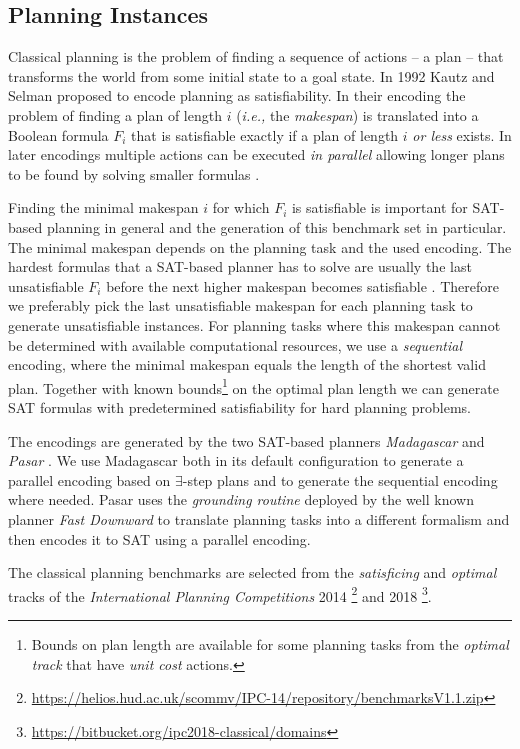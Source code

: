 \documentclass{elsarticle}
\begin{document}
\subsection{Planning Instances}
Classical planning is the problem of finding a sequence of actions -- a plan --
that transforms the world from some initial state to a goal state. In 1992 Kautz
and Selman
\cite{Kautz1992} proposed to encode planning as satisfiability. In their
encoding the problem of finding a plan of length $i$ (\textit{i.e.,} the
\emph{makespan}) is translated into a Boolean formula $F_i$ that is satisfiable
exactly if a plan of length $i$ \emph{or less} exists. In later encodings
multiple actions can be executed \emph{in parallel} allowing longer plans to be
found by solving smaller formulas \cite{Rintanen2006, Rintanen2007, Balyo2013}.

Finding the minimal makespan $i$ for which $F_i$ is satisfiable is important for
SAT-based planning in general and the generation of this benchmark set in
particular. The minimal makespan depends on the planning task and the used
encoding. The hardest formulas that a SAT-based planner has to solve are usually
the last unsatisfiable $F_i$ before the next higher makespan becomes satisfiable
\cite{Rintanen2006}. Therefore we preferably pick the last unsatisfiable
makespan for each planning task to generate unsatisfiable instances. For
planning tasks where this makespan cannot be determined with available
computational resources, we use a \emph{sequential} encoding, where the minimal
makespan equals the length of the shortest valid plan. Together with known
bounds\footnote{Bounds on plan length are available for some planning tasks from
  the \emph{optimal track} that have \emph{unit cost} actions.} on the optimal
plan length we can generate SAT formulas with predetermined satisfiability for
hard planning problems.

The encodings are generated by the two SAT-based planners \emph{Madagascar}
\cite{Madagascar14} and \emph{Pasar} \cite{Pasar19}. We use Madagascar both in
its default configuration to generate a parallel encoding based on
$\exists$-step plans and to generate the sequential encoding where needed. Pasar
uses the \emph{grounding routine} deployed by the well known planner \emph{Fast
  Downward} \cite{FastDownward06} to translate planning tasks into a different
formalism and then encodes it to SAT using a parallel encoding.

The classical planning benchmarks are selected from the \emph{satisficing} and
\emph{optimal} tracks of the \emph{International Planning Competitions} 2014
\footnote{\url{https://helios.hud.ac.uk/scommv/IPC-14/repository/benchmarksV1.1.zip}}
and 2018 \footnote{\url{https://bitbucket.org/ipc2018-classical/domains}}.
\end{document}
